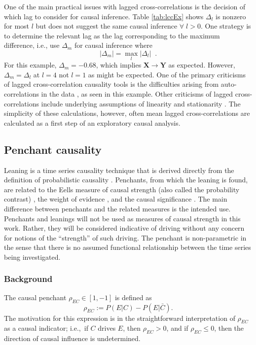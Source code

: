 \documentclass{article}[10pt]
\begin{document}
One of the main practical issues with lagged cross-correlations is the decision of which lag to consider for causal inference.  Table \ref{tab:lccEx} shows $\Delta_l$ is nonzero for most $l$ but does not suggest the same causal inference $\forall\;l>0$.  One strategy is to determine the relevant lag as the lag corresponding to the maximum difference, i.e., use $\Delta_{m}$ for causal inference where
\begin{equation}
|\Delta_{m}| = \max_l |\Delta_l|\;\;.
\end{equation}
For this example, $\Delta_m = - 0.68$, which implies $\mathbf{X}\rightarrow\mathbf{Y}$ as expected.  However, $\Delta_m=\Delta_l$ at $l=4$ not $l=1$ as might be expected.  One of the primary criticisms of lagged cross-correlation causality tools is the difficulties arising from auto-correlations in the data \cite{Mcnames2007,Runge2014}, as seen in this example.  Other criticisms of lagged cross-correlations include underlying assumptions of linearity \cite{Mcnames2007} and stationarity \cite{Rogosa1980}.  The simplicity of these calculations, however, often mean lagged cross-correlations are calculated as a first step of an exploratory causal analysis.  

\subsection{Penchant causality}
\label{sec:lean}
Leaning is a time series causality technique that is derived directly from the definition of probabilistic causality \cite{Suppes1970}.  Penchants, from which the leaning is found, are related to the Eells measure of causal strength (also called the probability contrast) \cite{Illari2011}, the weight of evidence \cite{Good1984}, and the causal significance \cite{Kleinberg2012}.  The main difference between penchants and the related measures is the intended use.  Penchants and leanings will not be used as measures of causal strength in this work.  Rather, they will be considered indicative of driving without any concern for notions of the ``strength'' of such driving.  The penchant is non-parametric in the sense that there is no assumed functional relationship between the time series being investigated.

\subsubsection{Background}
The causal penchant $\rho_{EC}\in\left[1,-1\right]$ is defined as
\begin{equation}
\label{eq:pen}
\rho_{EC} := P\left(E|C\right) - P\left(E|\bar{C}\right).
\end{equation}
The motivation for this expression is in the straightforward interpretation of $\rho_{EC}$ as a causal indicator; i.e.,\ if $C$ drives $E$, then $\rho_{EC} > 0$, and if $\rho_{EC} \le 0$, then the direction of causal influence is undetermined.    
\end{document}
